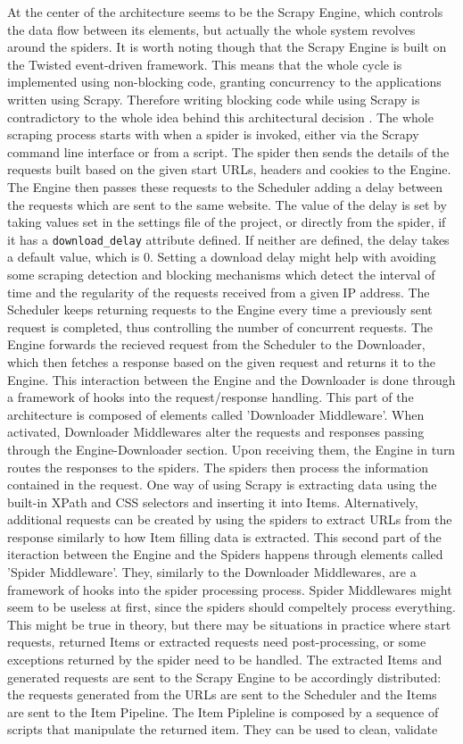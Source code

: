 \documentclass[12pt,a4paper,twoside]{report}
\begin{document}
At the center of the architecture seems to be the Scrapy Engine, which controls the data flow between its elements, but actually the whole system revolves around the spiders. It is worth noting though that the Scrapy Engine is built on the Twisted event-driven framework. This means that the whole cycle is implemented using non-blocking code, granting concurrency to the applications written using Scrapy. Therefore writing blocking code while using Scrapy is contradictory to the whole idea behind this architectural decision \cite{learning_scrapy}. The whole scraping process starts with when a spider is invoked, either via the Scrapy command line interface or from a script. The spider then sends the details of the requests built based on the given start URLs, headers and cookies to the Engine. The Engine then passes these requests to the Scheduler adding a delay between the requests which are sent to the same website. The value of the delay is set by taking values set in the settings file of the project, or directly from the spider, if it has a \lstinline$download_delay$ attribute defined. If neither are defined, the delay takes a default value, which is 0. Setting a download delay might help with avoiding some scraping detection and blocking mechanisms which detect the interval of time and the regularity of the requests received from a given IP address. The Scheduler keeps returning requests to the Engine every time a previously sent request is completed, thus controlling the number of concurrent requests. The Engine forwards the recieved request from the Scheduler to the Downloader, which then fetches a response based on the given request and returns it to the Engine. This interaction between the Engine and the Downloader is done through a framework of hooks into the request/response handling. This part of the architecture is composed of elements called 'Downloader Middleware'. When activated, Downloader Middlewares alter the requests and responses passing through the Engine-Downloader section. Upon receiving them, the Engine in turn routes the responses to the spiders. The spiders then process the information contained in the request. One way of using Scrapy is extracting data using the built-in XPath and CSS selectors and inserting it into Items. Alternatively, additional requests can be created by using the spiders to extract URLs from the response similarly to how Item filling data is extracted. This second part of the iteraction between the Engine and the Spiders happens through elements called 'Spider Middleware'. They, similarly to the Downloader Middlewares, are a framework of hooks into the spider processing process. Spider Middlewares might seem to be useless at first, since the spiders should compeltely process everything. This might be true in theory, but there may be situations in practice where start requests, returned Items or extracted requests need post-processing, or some exceptions returned by the spider need to be handled. The extracted Items and generated requests are sent to the Scrapy Engine to be accordingly distributed: the requests generated from the URLs are sent to the Scheduler and the Items are sent to the Item Pipeline. The Item Pipleline is composed by a sequence of scripts that manipulate the returned item. They can be used to clean, validate 
\end{document}
